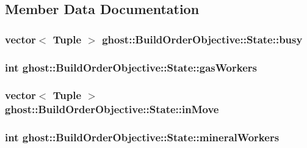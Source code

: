 \subsection{Member Data Documentation}
\hypertarget{structghost_1_1BuildOrderObjective_1_1State_a451d864f0e411c953f2e31f8048b75c6}{
\subsubsection[{busy}]{\setlength{\rightskip}{0pt plus 5cm}vector$<$ {\bf Tuple} $>$ ghost\-::\-Build\-Order\-Objective\-::\-State\-::busy}}\label{structghost_1_1BuildOrderObjective_1_1State_a451d864f0e411c953f2e31f8048b75c6}
\hypertarget{structghost_1_1BuildOrderObjective_1_1State_a17467d1d4d7d6a8f7ccfa96ae90a6bd8}{
\subsubsection[{gas\-Workers}]{\setlength{\rightskip}{0pt plus 5cm}int ghost\-::\-Build\-Order\-Objective\-::\-State\-::gas\-Workers}}\label{structghost_1_1BuildOrderObjective_1_1State_a17467d1d4d7d6a8f7ccfa96ae90a6bd8}
\hypertarget{structghost_1_1BuildOrderObjective_1_1State_a9083a73ad0675c4b96c199416aa843d5}{
\subsubsection[{in\-Move}]{\setlength{\rightskip}{0pt plus 5cm}vector$<$ {\bf Tuple} $>$ ghost\-::\-Build\-Order\-Objective\-::\-State\-::in\-Move}}\label{structghost_1_1BuildOrderObjective_1_1State_a9083a73ad0675c4b96c199416aa843d5}
\hypertarget{structghost_1_1BuildOrderObjective_1_1State_aa4de47baa8f94de50faec04b91e365c3}{
\subsubsection[{mineral\-Workers}]{\setlength{\rightskip}{0pt plus 5cm}int ghost\-::\-Build\-Order\-Objective\-::\-State\-::mineral\-Workers}}\label{structghost_1_1BuildOrderObjective_1_1State_aa4de47baa8f94de50faec04b91e365c3}
